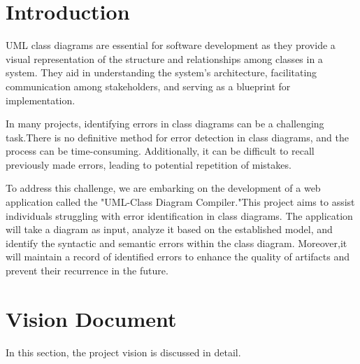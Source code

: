 \documentclass[12pt,a4paper]{article}
\begin{document}

\pagestyle{empty}

\clearpage
\pagestyle{fancy}
\fancyhf{}
\fancyhead[R]{\thepage}
\setcounter{page}{1}
\tableofcontents
\newpage
\listoftables
\newpage
\listoffigures
\clearpage
\section{Introduction}
UML class diagrams are essential for software development as they provide a visual representation of the structure and relationships among classes in a system. They aid in understanding the system's architecture, facilitating communication among stakeholders, and serving as a blueprint for implementation.
\par In many projects, identifying errors in class diagrams can be a challenging task.There is no definitive method for error detection in class diagrams, and the process can be time-consuming. Additionally, it can be difficult to recall previously made errors, leading to potential repetition of mistakes.
\par To address this challenge, we are embarking on the development of a web application called the "UML-Class Diagram Compiler."This project aims to assist individuals struggling with error identification in class diagrams. The application will take a diagram as input, analyze it based on the established model, and identify the syntactic and semantic errors within the class diagram. Moreover,it will maintain a record of identified errors to enhance the quality of artifacts and prevent their recurrence in the future.
\section{Vision Document}
In this section, the project vision is discussed in detail.
\end{document}
